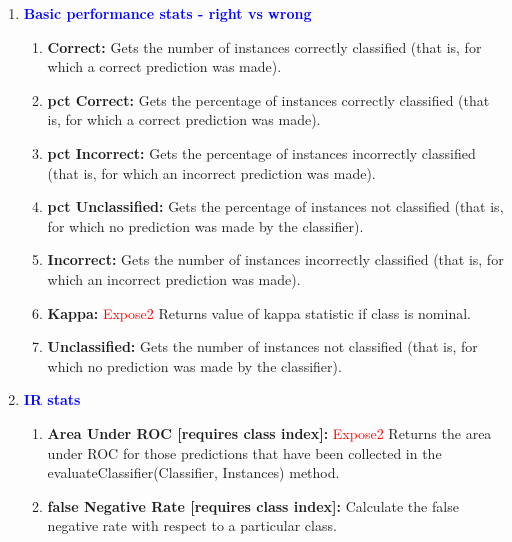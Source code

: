 \documentclass[a4paper,12pt, english]{article}
\begin{document}
\begin{enumerate}

\item \textbf{\textcolor{blue}{Basic performance stats - right vs wrong}}
\begin{enumerate}
              
\item \textbf{Correct: }
          Gets the number of instances correctly classified (that is, for which a correct prediction was made).
          
\item \textbf{pct Correct: }
          Gets the percentage of instances correctly classified (that is, for which a correct prediction was made). 

\item \textbf{pct Incorrect: }
          Gets the percentage of instances incorrectly classified (that is, for which an incorrect prediction was made).

\item \textbf{pct Unclassified: }
          Gets the percentage of instances not classified (that is, for which no prediction was made by the classifier). 

\item \textbf{Incorrect: }
          Gets the number of instances incorrectly classified (that is, for which an incorrect prediction was made). 
          
\item \textbf{Kappa: } \textcolor{red}{Expose2}
          Returns value of kappa statistic if class is nominal. 
          
\item \textbf{Unclassified: }
          Gets the number of instances not classified (that is, for which no prediction was made by the classifier).
\end{enumerate}    

\item  \textbf{\textcolor{blue}{IR stats}}
\begin{enumerate}          
\item \textbf{Area Under ROC  [requires class index]: } \textcolor{red}{Expose2}
          Returns the area under ROC for those predictions that have been collected in the evaluateClassifier(Classifier, Instances) method. 
          
\item \textbf{false Negative Rate [requires class index]: }
          Calculate the false negative rate with respect to a particular class. 
          

\end{enumerate}
\end{enumerate}
\end{document}
